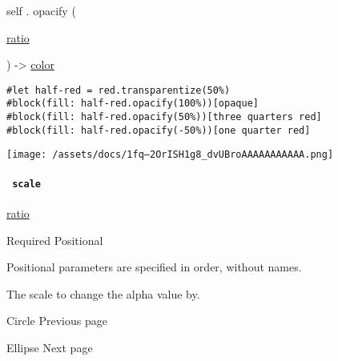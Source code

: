 self { . } { opacify } (

{ \href{/docs/reference/layout/ratio/}{ratio} }

) -\textgreater{} \href{/docs/reference/visualize/color/}{color}

\begin{verbatim}
#let half-red = red.transparentize(50%)
#block(fill: half-red.opacify(100%))[opaque]
#block(fill: half-red.opacify(50%))[three quarters red]
#block(fill: half-red.opacify(-50%))[one quarter red]
\end{verbatim}

\texttt{[image: /assets/docs/1fq--2OrISH1g8\_dvUBroAAAAAAAAAAA.png]}

\paragraph{\texorpdfstring{\texttt{\ scale\ }}{ scale }}\label{definitions-opacify-scale}

\href{/docs/reference/layout/ratio/}{ratio}

{Required} {{ Positional }}

\label{definitions-opacify-scale-positional-tooltip}
Positional parameters are specified in order, without names.

The scale to change the alpha value by.

\href{/docs/reference/visualize/circle/}{\pandocbounded{}}

{ Circle } { Previous page }

\href{/docs/reference/visualize/ellipse/}{\pandocbounded{}}

{ Ellipse } { Next page }


